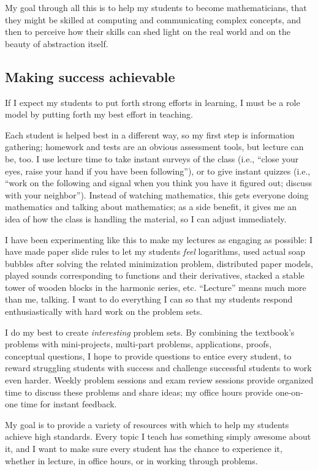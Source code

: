 \documentclass[12pt]{amsart}
\begin{document}
My goal through all this is to help my students to become
mathematicians, that they might be skilled at computing and
communicating complex concepts, and then to perceive how their skills
can shed light on the real world and on the beauty of abstraction
itself.

\subsection*{Making success achievable}

If I expect my students to put forth strong efforts in learning, I
must be a role model by putting forth my best effort in teaching.

Each student is helped best in a different way, so my first step is
information gathering; homework and tests are an obvious assessment
tools, but lecture can be, too.  I use lecture time to take instant
surveys of the class (i.e., ``close your eyes, raise your hand if you
have been following''), or to give instant quizzes (i.e., ``work on
the following and signal when you think you have it figured out;
discuss with your neighbor'').  Instead of watching mathematics, this
gets everyone doing mathematics and talking about mathematics; as a
side benefit, it gives me an idea of how the class is handling the
material, so I can adjust immediately.

I have been experimenting like this to make my lectures as engaging as
possible: I have made paper slide rules to let my students \textit{feel}
logarithms, used actual soap bubbles after solving the related
minimization problem, distributed paper models, played sounds
corresponding to functions and their derivatives, stacked a stable
tower of wooden blocks in the harmonic series, etc.  ``Lecture'' means
much more than me, talking.  I want to do everything I can so that my
students respond enthusiastically with hard work on the problem sets.

I do my best to create \textit{interesting} problem sets.  By
combining the textbook's problems with mini-projects, multi-part
problems, applications, proofs, conceptual questions, I hope to
provide questions to entice every student, to reward struggling
students with success and challenge successful students to work even
harder.  Weekly problem sessions and exam review sessions provide
organized time to discuss these problems and share ideas; my office
hours provide one-on-one time for instant feedback.

My goal is to provide a variety of resources with which to help my
students achieve high standards.  Every topic I teach has something
simply awesome about it, and I want to make sure every student has the
chance to experience it, whether in lecture, in office hours, or in working through problems.
\end{document}
